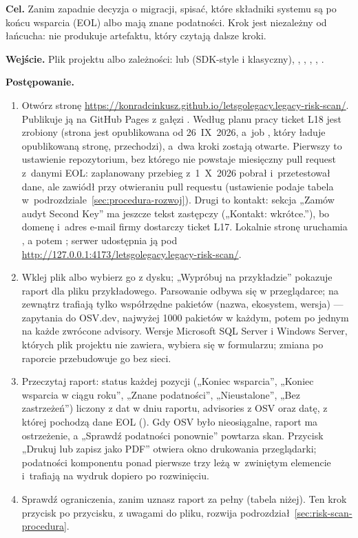 \textbf{Cel.} Zanim zapadnie decyzja o migracji, spisać, które składniki systemu są po
końcu wsparcia (EOL) albo mają znane podatności. Krok jest niezależny od łańcucha: nie
produkuje artefaktu, który czytają dalsze kroki.

\textbf{Wejście.} Plik projektu albo zależności:  lub 
(SDK-style i klasyczny), , ,
, , .

\textbf{Postępowanie.}
\begin{enumerate}
  \item Otwórz stronę \url{https://konradcinkusz.github.io/letsgolegacy.legacy-risk-scan/}.
        Publikuje ją  na GitHub Pages z gałęzi . Według planu
        pracy ticket L18 jest zrobiony (strona jest opublikowana od 26~IX~2026, a~job
        , który ładuje opublikowaną stronę, przechodzi), a~dwa kroki zostają
        otwarte. Pierwszy to ustawienie repozytorium, bez którego nie powstaje miesięczny pull
        request z~danymi EOL: zaplanowany przebieg z~1~X~2026 pobrał i~przetestował dane, ale
        zawiódł przy otwieraniu pull requestu (ustawienie podaje tabela
        w~podrozdziale~\ref{sec:procedura-rozwoj}). Drugi to kontakt: sekcja „Zamów audyt
        Second Key” ma jeszcze tekst zastępczy („Kontakt: wkrótce.”), bo domenę i~adres e-mail
        firmy dostarczy ticket L17. Lokalnie stronę uruchamia , a potem
        ; serwer udostępnia ją pod
        \url{http://127.0.0.1:4173/letsgolegacy.legacy-risk-scan/}.
  \item Wklej plik albo wybierz go z dysku; „Wypróbuj na przykładzie” pokazuje raport dla
        pliku przykładowego. Parsowanie odbywa się w przeglądarce; na zewnątrz trafiają
        tylko współrzędne pakietów (nazwa, ekosystem, wersja) --- zapytania
         do OSV.dev, najwyżej 1000 pakietów w każdym, potem po jednym
         na każde zwrócone advisory. Wersje Microsoft SQL Server i Windows
        Server, których plik projektu nie zawiera, wybiera się w formularzu; zmiana po
        raporcie przebudowuje go bez sieci.
  \item Przeczytaj raport: status każdej pozycji („Koniec wsparcia”, „Koniec wsparcia
        w ciągu roku”, „Znane podatności”, „Nieustalone”, „Bez zastrzeżeń”) liczony z dat
        w dniu raportu, advisories z OSV oraz datę, z której pochodzą dane EOL
        (). Gdy OSV było nieosiągalne, raport ma ostrzeżenie,
        a „Sprawdź podatności ponownie” powtarza skan. Przycisk „Drukuj lub zapisz jako PDF”
        otwiera okno drukowania przeglądarki; podatności komponentu ponad pierwsze trzy leżą
        w~zwiniętym elemencie i~trafiają na wydruk dopiero po rozwinięciu.
  \item Sprawdź ograniczenia, zanim uznasz raport za pełny (tabela niżej). Ten krok przycisk
        po przycisku, z uwagami do pliku, rozwija podrozdział~\ref{sec:risk-scan-procedura}.
\end{enumerate}

